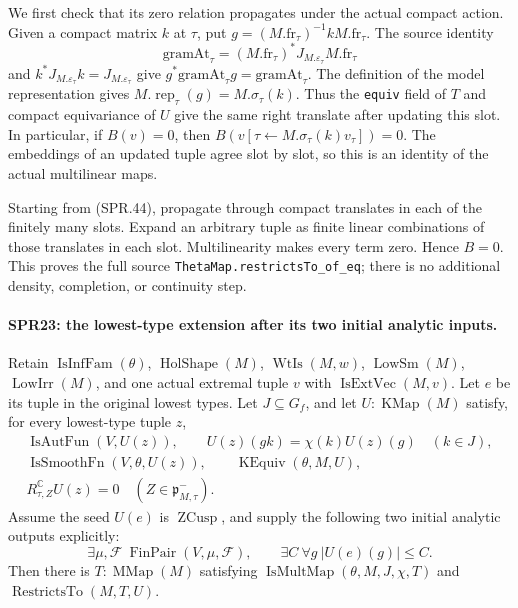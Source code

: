 We first check that its zero relation propagates under the
actual compact action.  Given a compact matrix \(k\) at \(\tau\),
put \(g=(M.\mathrm{fr}_\tau)^{-1}kM.\mathrm{fr}_\tau\).
The source identity
\[
 \mathrm{gramAt}_\tau
   =(M.\mathrm{fr}_\tau)^*J_{M.\varepsilon_\tau}
                         M.\mathrm{fr}_\tau
 \tag{SPR.45}
\]
and \(k^*J_{M.\varepsilon_\tau}k=J_{M.\varepsilon_\tau}\)
give \(g^*\mathrm{gramAt}_\tau g=\mathrm{gramAt}_\tau\).
The definition of the model representation gives
\(M.\operatorname{rep}_\tau(g)=M.\sigma_\tau(k)\).
Thus the \texttt{equiv} field of \(T\) and compact equivariance
of \(U\) give the same right translate after updating this
slot.  In particular, if \(B(v)=0\), then
\(B(v[\tau\leftarrow M.\sigma_\tau(k)v_\tau])=0\).
The embeddings of an updated tuple agree slot by slot, so this
is an identity of the actual multilinear maps.

Starting from (SPR.44), propagate through compact translates
in each of the finitely many slots.  Expand an arbitrary tuple
as finite linear combinations of those translates in each slot.
Multilinearity makes every term zero.  Hence \(B=0\).
This proves the full source \texttt{ThetaMap.\allowbreak restrictsTo\_\allowbreak of\_\allowbreak eq};
there is no additional density, completion, or continuity step.

\paragraph{SPR23: the lowest-type extension after its two initial analytic inputs.}
\label{claim:SPR23}
Retain \(\operatorname{IsInfFam}(\theta)\),
\(\operatorname{HolShape}(M)\), \(\operatorname{WtIs}(M,w)\),
\(\operatorname{LowSm}(M)\), \(\operatorname{LowIrr}(M)\),
and one actual extremal tuple \(v\) with
\(\operatorname{IsExtVec}(M,v)\).
Let \(e\) be its tuple in the original lowest types.
Let \(J\subseteq G_f\), and let \(U:\operatorname{KMap}(M)\)
satisfy, for every lowest-type tuple \(z\),
\[
\begin{gathered}
 \operatorname{IsAutFun}(V,U(z)),\qquad
 U(z)(gk)=\chi(k)U(z)(g)\quad(k\in J),\\
 \operatorname{IsSmoothFn}(V,\theta,U(z)),\qquad
 \operatorname{KEquiv}(\theta,M,U),\\
 R^\mathbb C_{\tau,Z}U(z)=0
                  \quad(Z\in\mathfrak p^-_{M,\tau}).
\end{gathered}
\tag{SPR.46}
\]
Assume the seed \(U(e)\) is \(\operatorname{ZCusp}\), and supply
the following two initial analytic outputs explicitly:
\[
 \exists\mu,\mathcal F\ \operatorname{FinPair}(V,\mu,\mathcal F),
 \qquad \exists C\ \forall g\ |U(e)(g)|\le C.
 \tag{SPR.47}
\]
Then there is \(T:\operatorname{MMap}(M)\) satisfying
\(\operatorname{IsMultMap}(\theta,M,J,\chi,T)\) and
\(\operatorname{RestrictsTo}(M,T,U)\).

